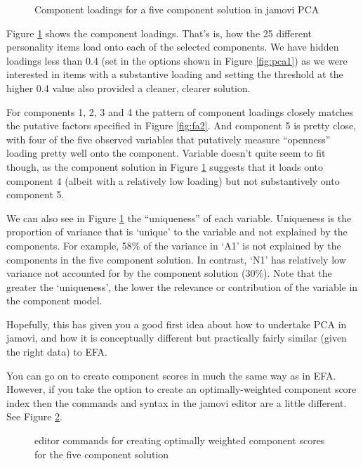 \begin{figure}[!htb]
\begin{center}
\caption{Component loadings for a five component solution in jamovi PCA}
\label{fig:pca5}
\HR
\end{center}
\end{figure}

Figure \ref{fig:pca5} shows the component loadings. That's is, how the 25 different personality items load onto each of the selected components. We have hidden loadings less than 0.4 (set in the options shown in Figure \ref{fig:pca1}) as we were interested in items with a substantive loading and setting the threshold at the higher 0.4 value also provided a cleaner, clearer solution. 

For components 1, 2, 3 and 4 the pattern of component loadings closely matches the putative factors specified in Figure \ref{fig:fa2}. And component 5 is pretty close, with four of the five observed variables that putatively measure “openness” loading pretty well onto the component. Variable  doesn’t quite seem to fit though, as the component solution in Figure \ref{fig:pca5} suggests that it loads onto component 4 (albeit with a relatively low loading) but not substantively onto component 5.

We can also see in Figure \ref{fig:pca5} the “uniqueness” of each variable. Uniqueness is the proportion of variance that is ‘unique’ to the variable and not explained by the components. For example, 58\% of the variance in ‘A1’ is not explained by the components in the five component solution. In contrast, ‘N1’ has relatively low variance not accounted for by the component solution (30\%). Note that the greater the ‘uniqueness’, the lower the relevance or contribution of the variable in the component model. 

Hopefully, this has given you a good first idea about how to undertake PCA in jamovi, and how it is conceptually different but practically fairly similar (given the right data) to EFA.

You can go on to create component scores in much the same way as in EFA. However, if you take the option to create an optimally-weighted component score index then the commands and syntax in the jamovi  editor are a little different. See Figure \ref{fig:pca6}. 

\begin{figure}[!htb]
\begin{center}
\caption{ editor commands for creating optimally weighted component scores for the five component solution}
\label{fig:pca6}
\HR
\end{center}
\end{figure}


